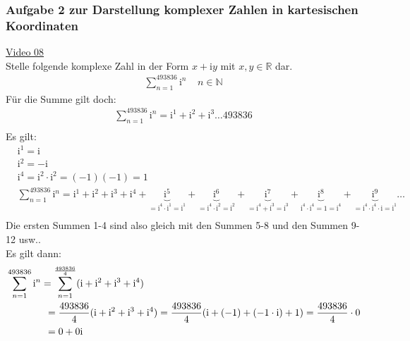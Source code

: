 \subsubsection{Aufgabe 2 zur Darstellung komplexer Zahlen in kartesischen Koordinaten}
\href{https://youtu.be/fm9W_BQeuOA}{Video 08}\\
Stelle folgende komplexe Zahl in der Form $ x+\mathrm{i}y $ mit $ x,y \in \mathbb{R} $ dar.\\
\begin{align*}
\sum\limits_{n=1}^{493836} \mathrm{i}^n\;\; \;\; n\in\mathbb{N}
\end{align*}
Für die Summe gilt doch:
\begin{align*}
\sum\limits_{n=1}^{493836} \mathrm{i}^n= \mathrm{i}^1+\mathrm{i}^2+\mathrm{i}^3\ldots 493836\\
\end{align*}
\newpage
\noindent
Es gilt:\\
\begin{align*}
&\mathrm{i}^1=\mathrm{i}\\
&\mathrm{i}^2=-\mathrm{i}\\
&\mathrm{i}^4=\mathrm{i}^2\cdot \mathrm{i}^2=(-1)(-1)=1\\
&\sum\limits_{n=1}^{493836} \mathrm{i}^n= \mathrm{i}^1+\mathrm{i}^2+\mathrm{i}^3+\mathrm{i}^4+\underbrace {\mathrm{i}^5}_{=\mathrm{i}^4\cdot \mathrm{i}^1=\mathrm{i}^1}+\underbrace {\mathrm{i}^6}_{=\mathrm{i}^4\cdot \mathrm{i}^2=\mathrm{i}^2}+\underbrace {\mathrm{i}^7}_{=\mathrm{i}^4+\mathrm{i}^3=\mathrm{i}^3}+\underbrace {\mathrm{i}^8}_{\mathrm{i}^4\cdot \mathrm{i}^4=1=\mathrm{i}^4}+\underbrace {\mathrm{i}^9}_{=\mathrm{i}^4\cdot \mathrm{i}^4\cdot \mathrm{i}=\mathrm{i}^1}\ldots\\
\end{align*}
Die ersten Summen 1-4 sind also gleich mit den Summen 5-8 und den Summen 9-12 usw..\\
Es gilt dann:\\
\begin{align*}
& \sum\limits_{n=1}^{493836} \mathrm{i}^n=\sum\limits_{n=1}^{\frac{493836}{4}}(\mathrm{i}+\mathrm{i}^2+\mathrm{i}^3+\mathrm{i}^4)\\
&\hspace{1.4cm}=\frac{493836}{4}(\mathrm{i}+\mathrm{i}^2+\mathrm{i}^3+\mathrm{i}^4)=\frac{493836}{4}(\mathrm{i}+(-1)+(-1\cdot \mathrm{i})+1)=\frac{493836}{4}\cdot 0\\
&\hspace{1.4cm}=0+0\mathrm{i}\\
\end{align*}
